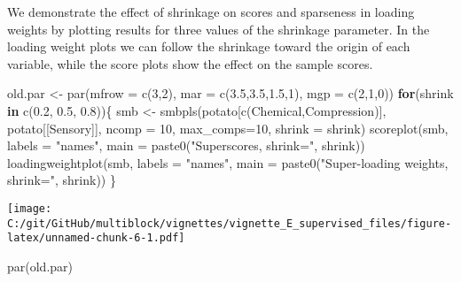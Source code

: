 \documentclass[
]{article}
\newenvironment{Shaded}{\begin{snugshade}}{\end{snugshade}}
\newcommand{\AttributeTok}[1]{\textcolor[rgb]{0.77,0.63,0.00}{#1}}
\newcommand{\ControlFlowTok}[1]{\textcolor[rgb]{0.13,0.29,0.53}{\textbf{#1}}}
\newcommand{\DecValTok}[1]{\textcolor[rgb]{0.00,0.00,0.81}{#1}}
\newcommand{\FloatTok}[1]{\textcolor[rgb]{0.00,0.00,0.81}{#1}}
\newcommand{\FunctionTok}[1]{\textcolor[rgb]{0.00,0.00,0.00}{#1}}
\newcommand{\NormalTok}[1]{#1}
\newcommand{\OtherTok}[1]{\textcolor[rgb]{0.56,0.35,0.01}{#1}}
\newcommand{\StringTok}[1]{\textcolor[rgb]{0.31,0.60,0.02}{#1}}
\begin{document}
We demonstrate the effect of shrinkage on scores and sparseness in
loading weights by plotting results for three values of the shrinkage
parameter. In the loading weight plots we can follow the shrinkage
toward the origin of each variable, while the score plots show the
effect on the sample scores.

\begin{Shaded}
\begin{Highlighting}[]
\NormalTok{old.par }\OtherTok{\textless{}{-}} \FunctionTok{par}\NormalTok{(}\AttributeTok{mfrow =} \FunctionTok{c}\NormalTok{(}\DecValTok{3}\NormalTok{,}\DecValTok{2}\NormalTok{), }\AttributeTok{mar =} \FunctionTok{c}\NormalTok{(}\FloatTok{3.5}\NormalTok{,}\FloatTok{3.5}\NormalTok{,}\FloatTok{1.5}\NormalTok{,}\DecValTok{1}\NormalTok{), }\AttributeTok{mgp =} \FunctionTok{c}\NormalTok{(}\DecValTok{2}\NormalTok{,}\DecValTok{1}\NormalTok{,}\DecValTok{0}\NormalTok{))}
\ControlFlowTok{for}\NormalTok{(shrink }\ControlFlowTok{in} \FunctionTok{c}\NormalTok{(}\FloatTok{0.2}\NormalTok{, }\FloatTok{0.5}\NormalTok{, }\FloatTok{0.8}\NormalTok{))\{}
\NormalTok{  smb }\OtherTok{\textless{}{-}} \FunctionTok{smbpls}\NormalTok{(potato[}\FunctionTok{c}\NormalTok{(}\StringTok{\textquotesingle{}Chemical\textquotesingle{}}\NormalTok{,}\StringTok{\textquotesingle{}Compression\textquotesingle{}}\NormalTok{)], potato[[}\StringTok{\textquotesingle{}Sensory\textquotesingle{}}\NormalTok{]], }\AttributeTok{ncomp =} \DecValTok{10}\NormalTok{,}
            \AttributeTok{max\_comps=}\DecValTok{10}\NormalTok{, }\AttributeTok{shrink =}\NormalTok{ shrink)}
  \FunctionTok{scoreplot}\NormalTok{(smb, }\AttributeTok{labels =} \StringTok{"names"}\NormalTok{, }\AttributeTok{main =} \FunctionTok{paste0}\NormalTok{(}\StringTok{"Superscores, shrink="}\NormalTok{, shrink))}
  \FunctionTok{loadingweightplot}\NormalTok{(smb, }\AttributeTok{labels =} \StringTok{"names"}\NormalTok{, }\AttributeTok{main =} \FunctionTok{paste0}\NormalTok{(}\StringTok{"Super{-}loading weights, shrink="}\NormalTok{, shrink))}
\NormalTok{\}}
\end{Highlighting}
\end{Shaded}

\texttt{[image: C:/git/GitHub/multiblock/vignettes/vignette\_E\_supervised\_files/figure-latex/unnamed-chunk-6-1.pdf]}

\begin{Shaded}
\begin{Highlighting}[]
\FunctionTok{par}\NormalTok{(old.par)}
\end{Highlighting}
\end{Shaded}
\end{document}
